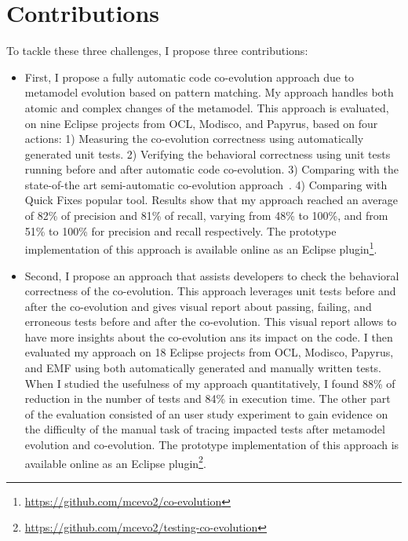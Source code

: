 \section{Contributions}
To tackle these three challenges, I propose three contributions:
\begin{itemize}[label=]

	\item First, I propose a fully automatic code co-evolution approach due to metamodel evolution based on pattern matching. My approach handles both atomic and complex changes of the metamodel. This approach is evaluated, on nine Eclipse projects from OCL, Modisco, and Papyrus, based on four actions: 1) Measuring the co-evolution correctness using automatically generated unit tests. 2) Verifying the behavioral correctness using unit tests running before and after automatic code co-evolution. 3) Comparing with the state-of-the art semi-automatic co-evolution approach~\cite{Khelladi2020}. 4) Comparing with Quick Fixes popular tool. Results show that my approach reached an average of 82\% of precision and 81\% of recall, varying from 48\% to 100\%, and from 51\% to 100\% for precision and recall respectively. The prototype implementation of this approach is available online as an Eclipse plugin\footnote{\url{https://github.com/mcevo2/co-evolution}}.
	
	
	\item Second, I propose an approach that assists developers to check the behavioral correctness of the co-evolution. This approach leverages unit tests before and after the co-evolution and gives visual report about passing, failing, and erroneous tests before and after the co-evolution. This visual report allows to have more insights about the co-evolution ans its impact on the code. I then evaluated my approach on 18 Eclipse projects from
	OCL, Modisco, Papyrus, and EMF using both automatically generated and manually written tests. When I studied the usefulness of my approach quantitatively, I found 88\% of reduction in the number of tests and 84\% in execution time. The other part of the evaluation consisted of an user study experiment to gain evidence on the difficulty of the manual task of tracing impacted tests after metamodel
	evolution and co-evolution. The prototype implementation of this approach is available online as an Eclipse plugin\footnote{\url{https://github.com/mcevo2/testing-co-evolution}}.
	

\end{itemize}
